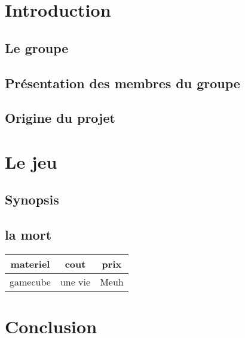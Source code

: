 \documentclass[12pt,a4paper]{article}
\begin{document}
\thispagestyle{empty}
\tableofcontents
	
\newpage
\section{Introduction}
\subsection{Le groupe}
\subsection{Présentation des membres du groupe}
\subsection{Origine du projet}
\newpage
\section{Le jeu}
\subsection{Synopsis}
\newpage
\subsection{la mort}

\newpage
\begin{tabular}{|c|c|c|}
	\hline
	 materiel & cout & prix   \\ 
	 \hline
 	 gamecube & une vie & Meuh  \\ 
	\hline
\end{tabular}





\newpage

\section{Conclusion}
	
	
	




	
\end{document}
